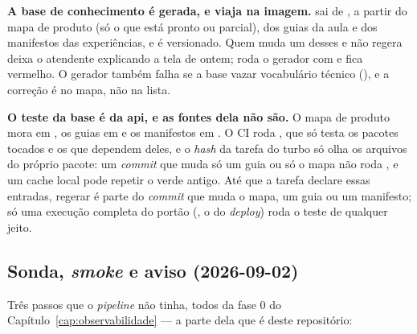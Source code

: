 \textbf{A base de conhecimento é gerada, e viaja na imagem.}
 sai de
, a partir do mapa de produto (só o que
está pronto ou parcial), dos guias da aula e dos manifestos das experiências, e
é versionado. Quem muda um desses e não regera deixa o atendente explicando a
tela de ontem;  roda o gerador com
 e fica vermelho. O gerador também falha se a base vazar
vocabulário técnico (), e a correção é no mapa, não na
lista.

\begin{limitacao}
\textbf{O teste da base é da api, e as fontes dela não são.} O mapa de produto
mora em , os guias em  e os
manifestos em . O CI roda , que só testa os pacotes tocados e os que dependem
deles, e o \emph{hash} da tarefa  do turbo só olha os arquivos do próprio
pacote: um \emph{commit} que muda só um guia ou só o mapa não roda
, e um cache local pode repetir o verde antigo. Até que a
tarefa declare essas entradas, regerar é parte do \emph{commit} que muda o mapa,
um guia ou um manifesto; só uma execução completa do portão (, o
 do \emph{deploy}) roda o teste de qualquer jeito.
\end{limitacao}

\subsection{Sonda, \emph{smoke} e aviso (2026-09-02)}

Três passos que o \emph{pipeline} não tinha, todos da fase 0 do
Capítulo~\ref{cap:observabilidade} --- a parte dela que é deste repositório:

